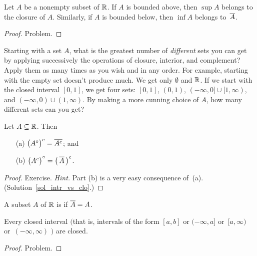 \begin{exam}\label{sup_in_clo} Let $A$ be a nonempty subset of $\mathbb{R}$. If $A$ is bounded above,
then $\sup A$ belongs to the closure of $A$.  Similarly, if $A$ is bounded below, then $\inf
A$ belongs to~$\overline{A}$.
\end{exam}

\begin{proof} Problem. \ns \end{proof}

\begin{prob} Starting with a set $A$, what is the greatest number of \emph{different} sets you
can get by applying successively the operations of closure, interior, and complement?  Apply
them as many times as you wish and in any order.  For example, starting with the empty set
doesn't produce much.  We get only $\emptyset$ and $\mathbb{R}$.  If we start with the closed interval
$[0,1]$, we get four sets: $[0,1]$, $(0,1)$, $(-\infty,0] \cup [1, \infty)$, and $(-\infty,0)
\cup (1, \infty)$.  By making a more cunning choice of $A$, how many different sets can you
get?
\end{prob}

\begin{prop}\label{intr_vs_clo} Let $A \subseteq \mathbb{R}$.  Then
 \begin{enumerate}
   \item[(a)] $\bigl(A^{\circ} \bigr)^c = \overline{A^c}$; and
   \item[(b)] $\bigl(A^c\bigr)^{\circ} = \bigl(\,\overline{A}\,\bigr)^c$.
 \end{enumerate}
\end{prop}

\begin{proof} Exercise. \emph{Hint.} Part (b) is a very easy consequence of~(a).
(Solution~\ref{sol_intr_vs_clo}.) \ns \end{proof}

\begin{defn} A subset $A$ of $\mathbb{R}$ is
 if $\overline{A} = A$.
\end{defn}

\begin{exam}\label{cl_int_cl} Every closed interval $\bigl($that is, intervals of the form
$[a,b]$ or $(-\infty,a]$ or~$[a,\infty)$ or~$(-\infty,\infty)$ $\bigr)$ are closed.
\end{exam}

\begin{proof} Problem. \ns \end{proof}

